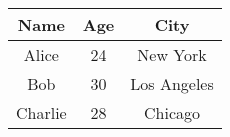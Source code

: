 \documentclass{article}
\begin{document}
\begin{tabular}{c|c|c}
\hline
Name & Age & City \\ \hline
Alice & 24 & New York \\ \hline
Bob & 30 & Los Angeles \\ \hline
Charlie & 28 & Chicago \\ \hline
\end{tabular}
\end{document}
